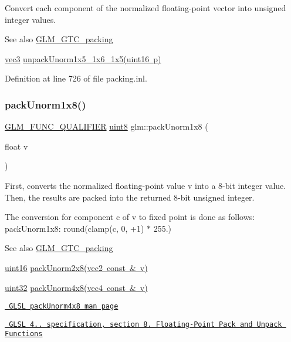 Convert each component of the normalized floating-\/point vector into unsigned integer values.

\begin{DoxySeeAlso}{See also}
\mbox{\hyperlink{group__gtc__packing}{G\+L\+M\+\_\+\+G\+T\+C\+\_\+packing}} 

\mbox{\hyperlink{group__core__types_ga1c47e8b3386109bc992b6c48e91b0be7}{vec3}} \mbox{\hyperlink{group__gtc__packing_ga6804d0525daf68bcac226f46fbb3b24e}{unpack\+Unorm1x5\+\_\+1x6\+\_\+1x5(uint16 p)}} 
\end{DoxySeeAlso}


Definition at line 726 of file packing.\+inl.

\mbox{\label{group__gtc__packing_ga2f9963e5d762b10085b280d3662017ba}} 
\subsubsection{\texorpdfstring{packUnorm1x8()}{packUnorm1x8()}}
{\footnotesize\ttfamily \mbox{\hyperlink{setup_8hpp_a33fdea6f91c5f834105f7415e2a64407}{G\+L\+M\+\_\+\+F\+U\+N\+C\+\_\+\+Q\+U\+A\+L\+I\+F\+I\+ER}} \mbox{\hyperlink{group__gtc__type__precision_ga1a7dcd8aac97cc8020817c94049deff2}{uint8}} glm\+::pack\+Unorm1x8 (\begin{DoxyParamCaption}\item[{float}]{v }\end{DoxyParamCaption})}

First, converts the normalized floating-\/point value v into a 8-\/bit integer value. Then, the results are packed into the returned 8-\/bit unsigned integer.

The conversion for component c of v to fixed point is done as follows\+: pack\+Unorm1x8\+: round(clamp(c, 0, +1) $\ast$ 255.)

\begin{DoxySeeAlso}{See also}
\mbox{\hyperlink{group__gtc__packing}{G\+L\+M\+\_\+\+G\+T\+C\+\_\+packing}} 

\mbox{\hyperlink{group__gtc__type__precision_gad8c2939e1fdd8e5828b31d95c52255d5}{uint16}} \mbox{\hyperlink{group__gtc__packing_ga833288fc0d4a79f19d0db75a6843bfe6}{pack\+Unorm2x8(vec2 const \& v)}} 

\mbox{\hyperlink{group__gtc__type__precision_ga202b6a53c105fcb7e531f9b443518451}{uint32}} \mbox{\hyperlink{group__core__func__packing_ga834ee9a9e73dcb0a7c1fc88143f3edb8}{pack\+Unorm4x8(vec4 const \& v)}} 

\href{http://www.opengl.org/sdk/docs/manglsl/xhtml/packUnorm4x8.xml}{\texttt{ G\+L\+SL pack\+Unorm4x8 man page}} 

\href{http://www.opengl.org/registry/doc/GLSLangSpec.4.20.8.pdf}{\texttt{ G\+L\+SL 4.. specification, section 8. Floating-\/\+Point Pack and Unpack Functions}} 
\end{DoxySeeAlso}


